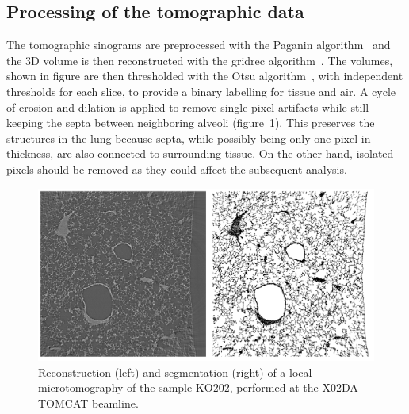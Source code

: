 \documentclass[preprint,12pt]{elsarticle}
\begin{document}
\subsection*{Processing of the tomographic data}\label{sec:tomoprocessing}
The tomographic sinograms are preprocessed with the Paganin
algorithm~\cite{Paganin_2002a} and
the 3D volume is then reconstructed with the gridrec
algorithm~\cite{Marone_2012}. The volumes, shown in
figure are then thresholded with the Otsu
algorithm~\cite{Otsu_1979}, with independent thresholds for each slice, to
provide a binary labelling for tissue and air. A cycle of
erosion and dilation is applied to remove single pixel artifacts while still
keeping the septa between neighboring alveoli (figure~\ref{591939}).
This preserves the structures in the lung because septa, while possibly
being only one pixel in thickness, are also connected to surrounding tissue.
On the other hand, isolated pixels should be removed as they could affect
the subsequent analysis.
\begin{figure}[h!]
\begin{center}
\includegraphics[width=0.70\columnwidth]{figures/reco/reco}
\caption{{Reconstruction (left) and segmentation (right) of a local
microtomography of the sample KO202, performed at the X02DA TOMCAT
beamline.
{\label{591939}}%
}}
\end{center}
\end{figure}
\end{document}
